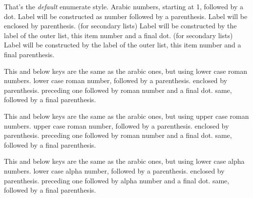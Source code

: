 \documentclass[dctools,english]{ufrgscca} %
\begin{document}
\begin{Keys}


	 That's the \emph{default} enumerate style. Arabic numbers, starting at 1, followed by a dot.
	 Label will be constructed as number followed by a parenthesis.
	 Label will be enclosed by parenthesis.
	 (for secondary lists) Label will be constructed by the label of the outer list, this item number and a final dot.
	 (for secondary lists) Label will be constructed by the label of the outer list, this item number and a final parenthesis.

	 This and below keys are the same as the arabic ones, but using lower case roman numbers.
	 lower case roman number, followed by a parenthesis.
	 enclosed by parenthesis.
	 preceding one followed by roman number and a final dot.
	 same, followed by a final parenthesis.

	 This and below keys are the same as the arabic ones, but using upper case roman numbers.
	 upper case roman number, followed by a parenthesis.
	 enclosed by parenthesis.
	 preceding one followed by roman number and a final dot.
	 same, followed by a final parenthesis.

	 This and below keys are the same as the arabic ones, but using lower case alpha numbers.
	 lower case alpha number, followed by a parenthesis.
	 enclosed by parenthesis.
	 preceding one followed by alpha number and a final dot.
	 same, followed by a final parenthesis.


\end{Keys}
\end{document}
